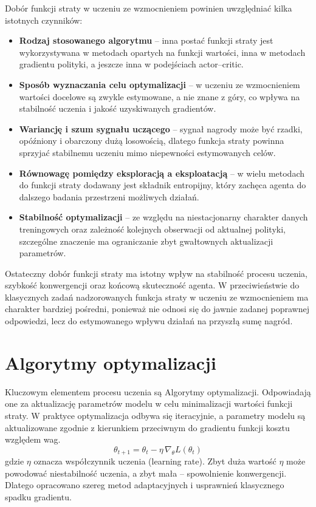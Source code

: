 Dobór funkcji straty w uczeniu ze wzmocnieniem powinien uwzględniać kilka istotnych czynników:
\begin{itemize}
	\item \textbf{Rodzaj stosowanego algorytmu} -- inna postać funkcji straty jest wykorzystywana w metodach opartych na funkcji wartości, inna w metodach gradientu polityki, a jeszcze inna w podejściach actor--critic.
	
	\item \textbf{Sposób wyznaczania celu optymalizacji} -- w uczeniu ze wzmocnieniem wartości docelowe są zwykle estymowane, a nie znane z góry, co wpływa na stabilność uczenia i jakość uzyskiwanych gradientów.
	
	\item \textbf{Wariancję i szum sygnału uczącego} -- sygnał nagrody może być rzadki, opóźniony i obarczony dużą losowością, dlatego funkcja straty powinna sprzyjać stabilnemu uczeniu mimo niepewności estymowanych celów.
	
	\item \textbf{Równowagę pomiędzy eksploracją a eksploatacją} -- w wielu metodach do funkcji straty dodawany jest składnik entropijny, który zachęca agenta do dalszego badania przestrzeni możliwych działań.
	
	\item \textbf{Stabilność optymalizacji} -- ze względu na niestacjonarny charakter danych treningowych oraz zależność kolejnych obserwacji od aktualnej polityki, szczególne znaczenie ma ograniczanie zbyt gwałtownych aktualizacji parametrów.
\end{itemize}

Ostateczny dobór funkcji straty ma istotny wpływ na stabilność procesu uczenia, szybkość konwergencji oraz końcową skuteczność agenta. W przeciwieństwie do klasycznych zadań nadzorowanych funkcja straty w uczeniu ze wzmocnieniem ma charakter bardziej pośredni, ponieważ nie odnosi się do jawnie zadanej poprawnej odpowiedzi, lecz do estymowanego wpływu działań na przyszłą sumę nagród.

\section{Algorytmy optymalizacji}

Kluczowym elementem procesu uczenia są Algorytmy optymalizacji. Odpowiadają one za aktualizację parametrów modelu w celu minimalizacji wartości funkcji straty. W praktyce optymalizacja odbywa się iteracyjnie, a parametry modelu są aktualizowane zgodnie z kierunkiem przeciwnym do gradientu funkcji kosztu względem wag.  \cite{Goodfellow-et-al-2016}
\[
\theta_{t+1} = \theta_t - \eta \, \nabla_\theta L(\theta_t)
\]
gdzie $\eta$ oznacza współczynnik uczenia (learning rate). Zbyt duża wartość $\eta$ może powodować niestabilność uczenia, a zbyt mała – spowolnienie konwergencji.
Dlatego opracowano szereg metod adaptacyjnych i usprawnień klasycznego spadku gradientu.

